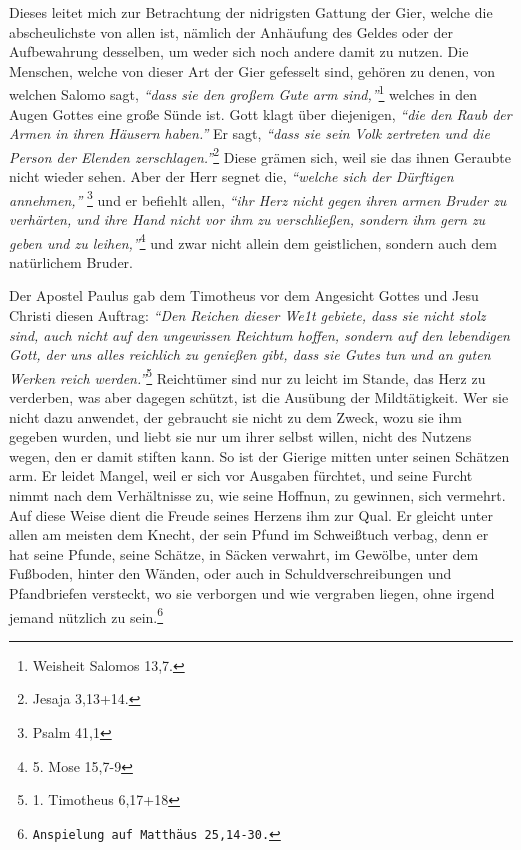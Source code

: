 Dieses leitet mich zur Betrachtung der nidrigsten Gattung der Gier, welche die
abscheulichste von allen ist, nämlich der Anhäufung des Geldes oder der
Aufbewahrung desselben, um weder sich noch andere damit zu nutzen. Die Menschen,
welche von dieser Art der Gier gefesselt sind, gehören zu denen, von welchen
Salomo sagt,
\textit{"`dass sie den großem Gute arm sind,"'}\footnote{Weisheit Salomos 13,7.}
welches in den Augen Gottes eine große Sünde ist. Gott klagt
über diejenigen,
\textit{"`die den Raub der Armen in ihren Häusern haben."'} Er sagt,
\textit{"`dass sie sein Volk
zertreten und die Person der Elenden zerschlagen."'}\footnote{Jesaja 3,13+14.}
Diese grämen sich, weil sie das ihnen Geraubte nicht wieder sehen. Aber der Herr
segnet die, \textit{"`welche sich der Dürftigen annehmen,"'}
\footnote{Psalm 41,1}
und er
befiehlt allen,
\textit{"`ihr Herz nicht gegen ihren armen Bruder zu verhärten, und ihre
Hand nicht vor ihm zu verschließen, sondern ihm gern zu geben und zu
leihen,"'}\footnote{5. Mose 15,7-9}
und zwar nicht allein dem geistlichen,
sondern auch dem natürlichem Bruder.

\medskip

Der Apostel Paulus gab dem Timotheus vor dem Angesicht Gottes und Jesu Christi
diesen Auftrag:
\textit{"`Den Reichen dieser We1t gebiete, dass sie nicht stolz sind,
auch nicht auf den ungewissen Reichtum hoffen, sondern auf den lebendigen Gott,
der uns alles reichlich zu genießen gibt, dass sie Gutes tun und an guten
Werken reich werden."'}\footnote{1. Timotheus 6,17+18}
Reichtümer sind nur zu leicht
im Stande, das Herz zu verderben, was aber
dagegen schützt, ist die Ausübung der
Mildtätigkeit. Wer sie nicht dazu anwendet, der gebraucht
sie nicht zu dem
Zweck, wozu sie ihm gegeben wurden, und liebt sie nur um ihrer selbst willen,
nicht des Nutzens wegen, den er damit stiften kann. So
ist der Gierige mitten
unter seinen Schätzen arm. Er leidet Mangel, weil er sich vor Ausgaben fürchtet,
und seine Furcht nimmt nach dem Verhältnisse zu, wie
seine Hoffnun, zu gewinnen,
sich vermehrt. Auf diese Weise dient die Freude seines Herzens ihm zur Qual. Er
gleicht unter allen am meisten dem Knecht, der sein Pfund im Schweißtuch
verbag, denn er hat seine Pfunde, seine Schätze, in Säcken verwahrt, im Gewölbe,
unter dem Fußboden, hinter den Wänden, oder auch in Schuldverschreibungen und
Pfandbriefen versteckt, wo sie verborgen und wie vergraben liegen, ohne irgend
jemand nützlich zu sein.\footnote{\texttt{Anspielung auf Matthäus 25,14-30.}}

